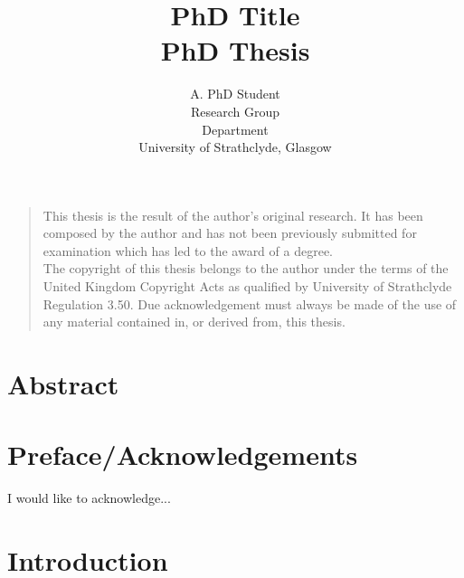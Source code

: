 \documentclass[a4paper,oneside,11pt]{book}
\title{PhD Title \\ PhD Thesis}
\author{A. PhD Student
\\ \small Research Group\\[-0.8ex]
\small Department\\[-0.8ex]
\small University of Strathclyde, Glasgow\\
}
\begin{document}
\maketitle


\frontmatter

\vspace*{\fill}
\noindent
\begin{quote}
	\centering
	This thesis is the result of the author's original research. It has been composed by the author and has not been previously submitted for examination which has led to the award of a degree. \\[5pt]
	The copyright of this thesis belongs to the author under the terms of the United Kingdom Copyright Acts as qualified by University of Strathclyde Regulation 3.50. Due acknowledgement must always be made of the use of any material contained in, or derived from, this thesis. \\[5pt]
\end{quote}
\vspace*{\fill}



\chapter{Abstract}



\tableofcontents

\listoffigures

\listoftables



\chapter{Preface/Acknowledgements}
I would like to acknowledge... 



\mainmatter


\chapter{Introduction}
\end{document}
